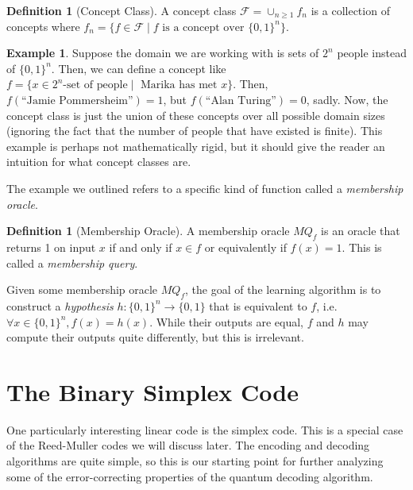 \documentclass[12pt,twoside]{reedthesis}
\theoremstyle{definition}
\newtheorem{definition}[theorem]{Definition}
\newtheorem{example}[theorem]{Example}
\begin{document}
\begin{definition}[Concept Class] A concept class $\mathcal{F} = \cup_{n \geq 1} f_n$ is a collection of concepts where $f_n = \{f \in \mathcal{F} \mid f \text{ is a concept over } \{0,1\}^n\}$.
\end{definition}

\begin{example}
Suppose the domain we are working with is sets of $2^n$ people instead of $\{0,1\}^n$. Then, we can define a concept like $f = \{ x\in 2^n \text{-set of people} \mid \text{ Marika has met } x\}$. Then, $f(\text{``Jamie Pommersheim''}) = 1$, but $f(\text{``Alan Turing''}) = 0$, sadly. Now, the concept class is just the union of these concepts over all possible domain sizes (ignoring the fact that the number of people that have existed is finite). This example is perhaps not mathematically rigid, but it should give the reader an intuition for what concept classes are.
\end{example}
The example we outlined refers to a specific kind of function called a \textit{membership oracle}.
\begin{definition}[Membership Oracle] A membership oracle $MQ_f$ is an oracle that returns 1 on input $x$ if and only if $x \in f$ or equivalently if $f(x)=1$. This is called a \textit{membership query}.
\end{definition}

Given some membership oracle $MQ_f$, the goal of the learning algorithm is to construct a \textit{hypothesis} $h: \{0,1\}^n \rightarrow \{0,1\}$ that is equivalent to $f$, i.e.~$\forall x \in \{0,1\}^n, f(x) = h(x)$. While their outputs are equal, $f$ and $h$ may compute their outputs quite differently, but this is irrelevant.

\chapter{The Binary Simplex Code}
One particularly interesting linear code is the simplex code. This is a special case of the Reed-Muller codes we will discuss later. The encoding and decoding algorithms are quite simple, so this is our starting point for further analyzing some of the error-correcting properties of the quantum decoding algorithm.
\end{document}

